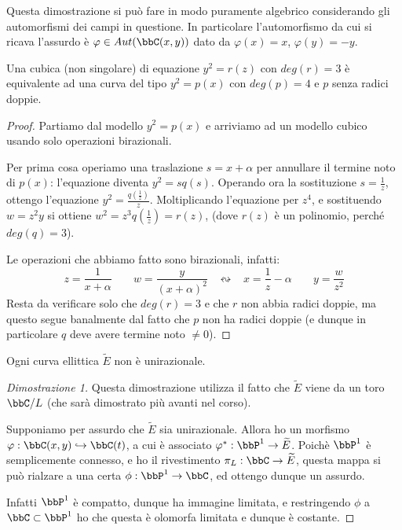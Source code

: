 \begin{osservazione}
Questa dimostrazione si può fare in modo puramente algebrico considerando gli automorfismi dei campi in questione. In particolare l'automorfismo da cui si ricava l'assurdo è $\varphi\in Aut(\bbC(x,y))$ dato da $\varphi(x)=x$, $\varphi(y)=-y$.
\end{osservazione}
\begin{lemma}
Una cubica (non singolare) di equazione $y^2=r(z)$ con $deg(r)=3$ è equivalente ad una curva del tipo $y^2=p(x)$ con $deg(p)=4$ e $p$ senza radici doppie.
\end{lemma}

\begin{proof}
Partiamo dal modello $y^2=p(x)$ e arriviamo ad un modello cubico usando solo operazioni birazionali.

Per prima cosa operiamo una traslazione $s=x+\alpha$ per annullare il termine noto di $p(x)$: l'equazione diventa $y^2=sq(s)$.
Operando ora la sostituzione $s=\frac{1}{z}$, ottengo l'equazione $y^2=\frac{q(\frac{1}{z})}{z}$. Moltiplicando l'equazione per $z^4$, e sostituendo $w=z^2y$ si ottiene $w^2=z^3q(\frac{1}{z})=r(z)$, (dove $r(z)$ è un polinomio, perché $deg(q)=3$).

Le operazioni che abbiamo fatto sono birazionali, infatti:
$$z=\frac{1}{x+\alpha}  \;\;\;\;\;\;\;   w=\frac{y}{(x+\alpha)^2}  \;\;\;\leftrightsquigarrow\;\;\;  x=\frac{1}{z}-\alpha   \;\;\;\;\;\;\;  y=\frac{w}{z^2}$$
Resta da verificare solo che $deg(r)=3$ e che $r$ non abbia radici doppie, ma questo segue banalmente dal fatto che $p$ non ha radici doppie (e dunque in particolare $q$ deve avere termine noto $\neq 0$).
\end{proof}

\begin{teorema}
Ogni curva ellittica $\widetilde{E}$ non è unirazionale.
\end{teorema}

\begin{proof}[Dimostrazione 1]
Questa dimostrazione utilizza il fatto che $\widetilde{E}$ viene da un toro $\bbC/L$ (che sarà dimostrato più avanti nel corso).

Supponiamo per assurdo che $\widetilde{E}$ sia unirazionale. Allora ho un morfismo $\varphi: \bbC(x,y)\hookrightarrow\bbC(t)$, a cui è associato $\varphi^*:\bbP^1\rightarrow\widetilde{E}$. Poichè $\bbP^1$ è semplicemente connesso, e ho il rivestimento $\pi_L:\bbC\rightarrow\widetilde{E}$, questa mappa si può rialzare a una certa $\phi:\bbP^1\rightarrow\bbC$, ed ottengo dunque un assurdo.

Infatti $\bbP^1$ è compatto, dunque ha immagine limitata, e restringendo $\phi$ a $\bbC\subset\bbP^1$ ho che questa è olomorfa limitata e dunque è costante.
\end{proof}

